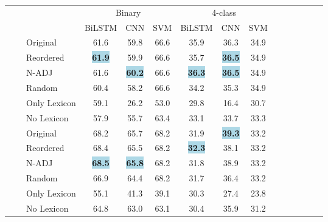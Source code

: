 \documentclass[11pt,a4paper]{article}
\newcommand{\rt}[1]{\rotatebox{90}{#1}}
\begin{document}
\begin{table*}[]
\newcommand{\sep}{\cmidrule(r){4-6}\cmidrule(r){7-9}}
\newcommand{\sepp}{\cmidrule(r){4-4}\cmidrule(r){5-5}\cmidrule(r){6-6}\cmidrule(r){7-7}\cmidrule(r){8-8}\cmidrule(r){9-9}}


\newcommand{\bestproj}[1]{{\setlength{\fboxsep}{0pt}\colorbox{lightblue}{\textbf{#1}}}}
\newcommand{\bestmono}[1]{{\setlength{\fboxsep}{0pt}\colorbox{lightgreen}{\textbf{#1}}}}
\newcommand{\bestmt}[1]{{\setlength{\fboxsep}{0pt}\colorbox{pink}{\textbf{#1}}}}

\setlength\tabcolsep{10pt}
\renewcommand*{\arraystretch}{0.8}
\centering\small
\begin{tabular}{lllcccccccccccc}
\toprule
&& & \multicolumn{3}{c}{Binary} & \multicolumn{3}{c}{4-class} \\
\sep
\multirow{16}{*}{\rt{Bilingual Word Embeddings}} 
	    &&& BiLSTM & CNN & SVM & BiLSTM & CNN & SVM \\
	    \cmidrule(r){4-4}\cmidrule(r){5-5}\cmidrule(r){6-6}\cmidrule(r){7-7}\cmidrule(r){8-8}\cmidrule(r){9-9}
	& \multirow{6}{*}{\rt{EN-ES}}
		& Original 	 & 61.6 & 59.8 & 66.6 & 35.9 & 36.3 & 34.9 \\ 
		&& Reordered  & \bestproj{61.9} & 59.9 & 66.6 & 35.7 & \bestproj{36.5} & 34.9 \\ 
		&& N-ADJ  & 61.6 & \bestproj{60.2} & 66.6 & \bestproj{36.3} & \bestproj{36.5} & 34.9 \\ 
		&& Random  & 60.4 & 58.2 & 66.6 & 34.2 & 35.3 & 34.9 \\ 
		&& Only Lexicon  & 59.1 & 26.2 & 53.0 & 29.8 & 16.4 & 30.7 \\ 
		&& No Lexicon  & 57.9 & 55.7 & 63.4 & 33.1 & 33.7 & 33.3 \\ 
	\sepp
	& \multirow{6}{*}{\rt{EN-CA}}
  		& Original & 68.2 & 65.7 & 68.2 & 31.9 & \bestproj{39.3} & 33.2 \\ 
		&& Reordered  & 68.4 & 65.5 & 68.2 & \bestproj{32.3} & 38.1 & 33.2 \\ 
		&& N-ADJ &  \bestproj{68.5} & \bestproj{65.8} & 68.2 & 31.8 & 38.9 & 33.2 \\ 
		&& Random & 66.9 & 64.4 & 68.2 & 31.7 & 36.4 & 33.2 \\ 
		&& Only Lexicon  & 55.1 & 41.3 & 39.1 & 30.3 & 27.4 & 23.8 \\ 
		&& No Lexicon & 64.8 & 63.0 & 63.1 & 30.4 & 35.9 & 31.2 \\ 



\end{tabular}
\end{table*}
\end{document}

